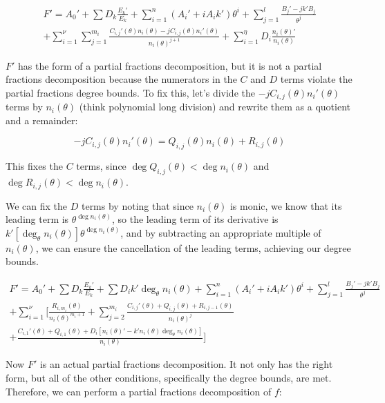 \begin{multline*}
F' = A_0' + \sum D_k \frac{E_k'}{E_k} + \sum_{i=1}^n (A_i' + i A_i k' )\theta^i
  + \sum_{j=1}^{l} \frac{B_{j}' - j k' B_{j}}{\theta^j} \\
  + \sum_{i=1}^\nu \sum_{j=1}^{m_i} \frac{C_{i,j}'(\theta) n_i(\theta) - j C_{i,j}(\theta) n_i'(\theta) }{n_i(\theta)^{j+1}}
  + \sum_{i=1}^\eta D_i \frac{n_i(\theta)'}{n_i(\theta)}
\end{multline*}

$F'$ has the form of a partial fractions decomposition, but it is not
a partial fractions decomposition because the numerators in the $C$
and $D$
terms violate the partial fractions degree bounds.  To fix this, let's
divide the $-jC_{i,j}(\theta)n_i'(\theta)$ terms by $n_i(\theta)$
(think polynomial long division) and rewrite them as a quotient
and a remainder:

$$-jC_{i,j}(\theta)n_i'(\theta) = Q_{i,j}(\theta) n_i(\theta) + R_{i,j}(\theta)$$

This fixes the $C$ terms, since $\deg Q_{i,j}(\theta) < \deg n_i(\theta)$
and $\deg R_{i,j}(\theta) < \deg n_i(\theta)$.

We can fix the $D$ terms by noting that since $n_i(\theta)$ is monic,
we know that its leading term is $\theta^{\deg n_i(\theta)}$, so
the leading term of its derivative is $k' [ \deg_\theta n_i(\theta) ] \theta^{\deg n_i(\theta)}$, and
by subtracting an appropriate multiple of $n_i(\theta)$,
we can ensure the cancellation of the leading terms,
achieving our degree bounds.

\begin{multline*}
F' = A_0' + \sum D_k \frac{E_k'}{E_k} + \sum D_i k' \deg_\theta n_i(\theta) + \sum_{i=1}^n (A_i' + i A_i k' )\theta^i
  + \sum_{j=1}^{l} \frac{B_{j}' - j k' B_{j}}{\theta^j} \\
  + \sum_{i=1}^\nu \Bigg[ \frac{R_{i,m_i}(\theta) }{n_i(\theta)^{m_i+1}}
  + \sum_{j=2}^{m_i} \frac{C_{i,j}'(\theta) + Q_{i,j}(\theta) + R_{i,j-1}(\theta) }{n_i(\theta)^{j}} \\
  + \frac{C_{i,1}'(\theta) + Q_{i,1}(\theta)
  + D_i \left[ n_i(\theta)' - k' n_i(\theta) \deg_\theta n_i(\theta) \right]}{n_i(\theta)} \Bigg]
\end{multline*}

Now $F'$ is an actual partial fractions decomposition.  It not only has
the right form, but all of the other conditions, specifically
the degree bounds, are met.
Therefore, we can perform
a partial fractions decomposition of $f$:

